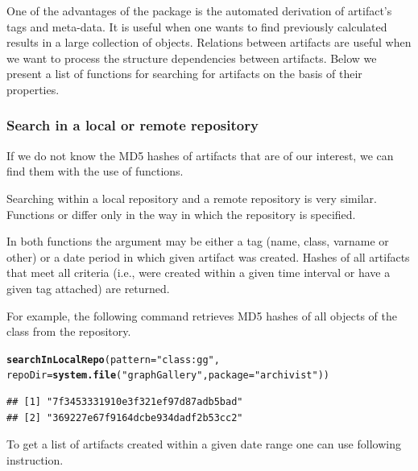 \documentclass[nojss]{jss}\usepackage[]{graphicx}\usepackage[]{color}
\makeatletter
\newcommand{\hlstr}[1]{\textcolor[rgb]{0.192,0.494,0.8}{#1}}%
\newcommand{\hlstd}[1]{\textcolor[rgb]{0.345,0.345,0.345}{#1}}%
\newcommand{\hlkwc}[1]{\textcolor[rgb]{0.333,0.667,0.333}{#1}}%
\newcommand{\hlkwd}[1]{\textcolor[rgb]{0.737,0.353,0.396}{\textbf{#1}}}%
\newenvironment{kframe}{%
 \def\at@end@of@kframe{}%
 \ifinner\ifhmode%
  \def\at@end@of@kframe{\end{minipage}}%
  \begin{minipage}{\columnwidth}%
 \fi\fi%
 \def\FrameCommand##1{\hskip\@totalleftmargin \hskip-\fboxsep
 \colorbox{shadecolor}{##1}\hskip-\fboxsep
     \hskip-\linewidth \hskip-\@totalleftmargin \hskip\columnwidth}%
 \MakeFramed {\advance\hsize-\width
   \@totalleftmargin\z@ \linewidth\hsize
   \@setminipage}}%
 {\par\unskip\endMakeFramed%
 \at@end@of@kframe}
\newenvironment{knitrout}{}{} %
\makeatother
\begin{document}
One of the advantages of the  package is the automated derivation of artifact’s tags and meta-data. It is useful when one wants to find previously calculated results in a large collection of  objects. Relations between artifacts are useful when we want to process the structure dependencies between artifacts.
Below we present a list of functions for searching for artifacts on the basis of their properties.

\subsubsection{Search in a local or remote repository}

If we do not know the MD5 hashes of artifacts that are of our interest, we can find them with the use of  functions.

Searching within a local repository and a remote repository is very similar. Functions  or  differ only in the way in which the repository is specified.

In both functions the  argument may be either a tag (name, class, varname or other) or a date period in which given artifact was created. Hashes of all artifacts that meet all criteria (i.e., were created within a given time interval or have a given tag attached) are returned.

For example, the following command retrieves MD5 hashes of all objects of the class  from the  repository.

\begin{knitrout}
\color{fgcolor}\begin{kframe}
\begin{alltt}
\hlkwd{searchInLocalRepo}\hlstd{(}\hlkwc{pattern} \hlstd{=} \hlstr{"class:gg"}\hlstd{,}
    \hlkwc{repoDir} \hlstd{=} \hlkwd{system.file}\hlstd{(}\hlstr{"graphGallery"}\hlstd{,} \hlkwc{package} \hlstd{=} \hlstr{"archivist"}\hlstd{))}
\end{alltt}
\begin{verbatim}
## [1] "7f3453331910e3f321ef97d87adb5bad"
## [2] "369227e67f9164dcbe934dadf2b53cc2"
\end{verbatim}
\end{kframe}
\end{knitrout}


To get a list of artifacts created within a given date range one can use following instruction.
\end{document}
